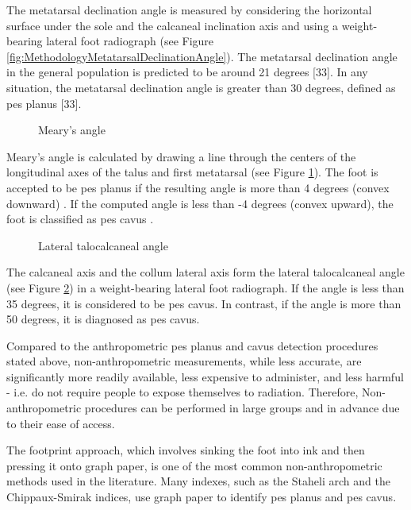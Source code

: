 The metatarsal declination angle is measured by considering the horizontal surface under the sole and the calcaneal inclination axis and using a weight-bearing lateral foot radiograph (see Figure \ref{fig:MethodologyMetatarsalDeclinationAngle}). The metatarsal declination angle in the general population is predicted to be around 21 degrees [33]. In any situation, the metatarsal declination angle is greater than 30 degrees, defined as pes planus [33].

\begin{figure}[htbp]
\centering
{}
\caption{Meary's angle \cite{radiopaediamearysangle}}
\label{fig:MethodologyMearysAngle}
\end{figure}

Meary's angle \cite{deniz2014ccocuklardaki} is calculated by drawing a line through the centers of the longitudinal axes of the talus and first metatarsal (see Figure \ref{fig:MethodologyMearysAngle}). The foot is accepted to be pes planus if the resulting angle is more than 4 degrees (convex downward) \cite{vanderwilde1988measurements}. If the computed angle is less than -4 degrees (convex upward), the foot is classified as pes cavus \cite{banks2001mcglamry}.

\begin{figure}[htbp]
\centering
{}
\caption{Lateral talocalcaneal angle \cite{radiopaediamearysangle}}
\label{fig:MethodologyLateralTalocalcanealAngle}
\end{figure}

The calcaneal axis and the collum lateral axis form the lateral talocalcaneal angle (see Figure \ref{fig:MethodologyLateralTalocalcanealAngle}) in a weight-bearing lateral foot radiograph.  If the angle is less than 35 degrees, it is considered to be pes cavus.  In contrast, if the angle is more than 50 degrees, it is diagnosed as pes cavus.

Compared to the anthropometric pes planus and cavus detection procedures stated above, non-anthropometric measurements, while less accurate, are significantly more readily available, less expensive to administer, and less harmful - i.e. do not require people to expose themselves to radiation. Therefore, Non-anthropometric procedures can be performed in large groups and in advance due to their ease of access.

The footprint approach, which involves sinking the foot into ink and then pressing it onto graph paper, is one of the most common non-anthropometric methods used in the literature. Many indexes, such as the Staheli arch and the Chippaux-Smirak indices, use graph paper to identify pes planus and pes cavus.

